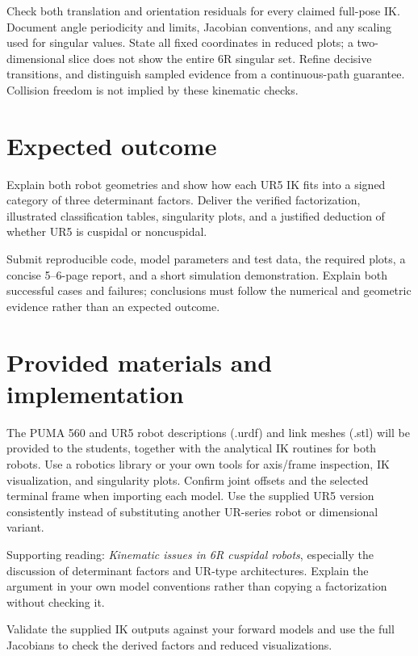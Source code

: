 \documentclass[11pt,a4paper]{article}
\begin{document}
Check both translation and orientation residuals
for every claimed full-pose IK. Document angle periodicity and limits,
Jacobian conventions, and any scaling used for singular values. State all
fixed coordinates in reduced plots; a two-dimensional slice does not show
the entire 6R singular set. Refine decisive transitions, and distinguish
sampled evidence from a continuous-path guarantee. Collision freedom is
not implied by these kinematic checks.

\section*{Expected outcome}
Explain both robot geometries and show how each UR5 IK fits into a signed
category of three determinant factors. Deliver the verified factorization,
illustrated classification tables, singularity plots, and a justified deduction
of whether UR5 is cuspidal or noncuspidal.

Submit reproducible code, model parameters and test data, the required plots,
a concise 5--6-page report, and a short simulation demonstration. Explain
both successful cases and failures; conclusions must follow the numerical
and geometric evidence rather than an expected outcome.

\section*{Provided materials and implementation}
The PUMA 560 and UR5 robot descriptions (.urdf) and link meshes (.stl) will be
provided to the students, together with the analytical IK routines for both
robots. Use a robotics library or your own tools for axis/frame inspection,
IK visualization, and singularity plots. Confirm joint offsets and the selected
terminal frame when importing each model. Use the supplied UR5 version
consistently instead of substituting another UR-series robot or dimensional
variant.

Supporting reading: \emph{Kinematic issues in 6R cuspidal robots},
especially the discussion of determinant factors and UR-type architectures.
Explain the argument in your own model conventions rather than copying a
factorization without checking it.

Validate the supplied IK outputs against your forward models and use the
full Jacobians to check the derived factors and reduced visualizations.
\end{document}
